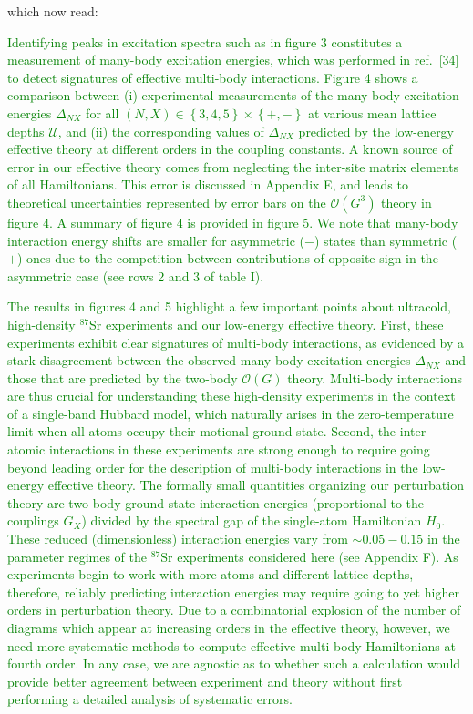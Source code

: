 \documentclass[preprint,showkeys,nofootinbib]{revtex4-1}
\newcommand{\p}[1]{\left(#1\right)} %
\renewcommand{\set}[1]{\left\{#1\right\}} %
\renewcommand{\O}{\mathcal{O}}
\newcommand{\U}{\mathcal{U}}
\newcommand{\1}{\mathds{1}}
\newcommand{\green}[1]{\textcolor{green}{#1}}
\begin{document}
\begin{enumerate}
  which now read:

  \green{Identifying peaks in excitation spectra such as in figure 3
    constitutes a measurement of many-body excitation energies, which
    was performed in ref.~[34] to detect signatures of effective
    multi-body interactions.  Figure 4 shows a comparison between (i)
    experimental measurements of the many-body excitation energies
    $\Delta_{NX}$ for all $\p{N,X}\in\set{3,4,5}\times\set{+,-}$ at
    various mean lattice depths $\U$, and (ii) the corresponding
    values of $\Delta_{NX}$ predicted by the low-energy effective
    theory at different orders in the coupling constants.  A known
    source of error in our effective theory comes from neglecting the
    inter-site matrix elements of all Hamiltonians.  This error is
    discussed in Appendix E, and leads to theoretical uncertainties
    represented by error bars on the $\O\p{G^3}$ theory in figure 4.
    A summary of figure 4 is provided in figure 5.  We note that
    many-body interaction energy shifts are smaller for asymmetric
    ($-$) states than symmetric ($+$) ones due to the competition
    between contributions of opposite sign in the asymmetric case (see
    rows 2 and 3 of table I).}

  \green{The results in figures 4 and 5 highlight a few important
    points about ultracold, high-density ${}^{87}$Sr experiments and
    our low-energy effective theory.  First, these experiments exhibit
    clear signatures of multi-body interactions, as evidenced by a
    stark disagreement between the observed many-body excitation
    energies $\Delta_{NX}$ and those that are predicted by the
    two-body $\O\p{G}$ theory.  Multi-body interactions are thus
    crucial for understanding these high-density experiments in the
    context of a single-band Hubbard model, which naturally arises in
    the zero-temperature limit when all atoms occupy their motional
    ground state.  Second, the inter-atomic interactions in these
    experiments are strong enough to require going beyond leading
    order for the description of multi-body interactions in the
    low-energy effective theory.  The formally small quantities
    organizing our perturbation theory are two-body ground-state
    interaction energies (proportional to the couplings $G_X$) divided
    by the spectral gap of the single-atom Hamiltonian $H_0$.  These
    reduced (dimensionless) interaction energies vary from
    $\sim0.05-0.15$ in the parameter regimes of the ${}^{87}$Sr
    experiments considered here (see Appendix F).  As experiments
    begin to work with more atoms and different lattice depths,
    therefore, reliably predicting interaction energies may require
    going to yet higher orders in perturbation theory.  Due to a
    combinatorial explosion of the number of diagrams which appear at
    increasing orders in the effective theory, however, we need more
    systematic methods to compute effective multi-body Hamiltonians at
    fourth order.  In any case, we are agnostic as to whether such a
    calculation would provide better agreement between experiment and
    theory without first performing a detailed analysis of systematic
    errors.}


\end{enumerate}
\end{document}
